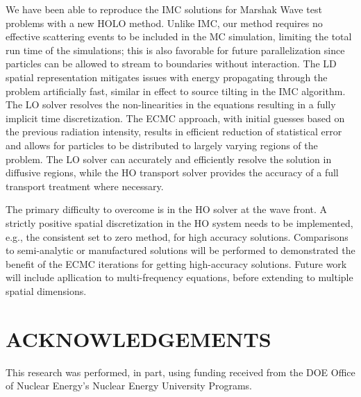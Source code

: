 \documentclass{mc2013}
\begin{document}

We have been able to reproduce the IMC solutions for Marshak Wave test problems with
a new HOLO method.  Unlike IMC, our method requires no effective scattering
events to be included in the MC simulation, limiting the total run time of the
simulations; this is also favorable for future parallelization since particles can be
allowed to stream to boundaries without interaction. The LD spatial representation mitigates issues with energy propagating
through the problem artificially fast, similar in effect to source tilting in the IMC
algorithm.   The LO solver resolves the non-linearities in the equations resulting in a fully
implicit time discretization.  The ECMC approach, with initial guesses based on the
previous radiation intensity, results in efficient reduction of statistical error and
allows for particles to be distributed to largely varying regions of the problem.
The LO solver
can accurately and efficiently resolve the solution in diffusive regions, while the HO
transport solver provides the accuracy of a full transport treatment where necessary. 

The primary difficulty to overcome is in the HO
solver at the wave front.  A strictly positive spatial discretization in the HO
system needs to be implemented, e.g., the consistent set to zero method, for high
accuracy solutions. Comparisons to semi-analytic or manufactured solutions will be
performed to demonstrated the benefit of the ECMC iterations for getting
high-accuracy solutions.    Future work will include apllication to multi-frequency 
equations, before extending to multiple spatial dimensions.


\section*{ACKNOWLEDGEMENTS}

This research was performed, in part, using funding received from the DOE Office of Nuclear
Energy's Nuclear Energy University Programs.

\setlength{\baselineskip}{12pt}


\end{document}
